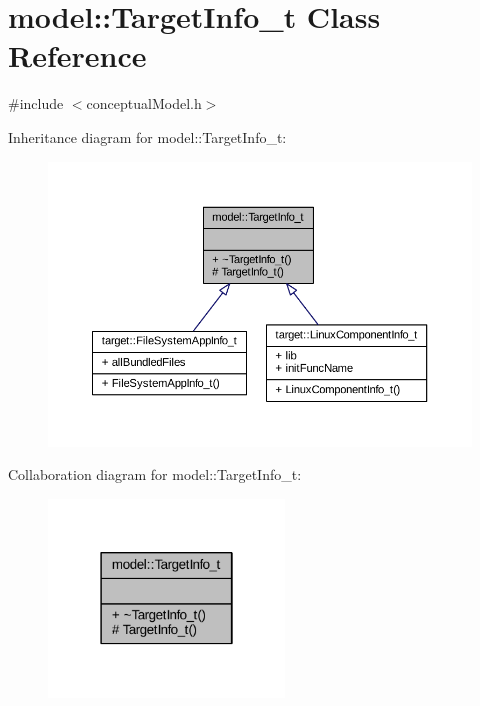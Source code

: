 \hypertarget{classmodel_1_1_target_info__t}{}\section{model\+:\+:Target\+Info\+\_\+t Class Reference}
\label{classmodel_1_1_target_info__t}


{\ttfamily \#include $<$conceptual\+Model.\+h$>$}



Inheritance diagram for model\+:\+:Target\+Info\+\_\+t\+:
\nopagebreak
\begin{figure}[H]
\begin{center}
\leavevmode
\includegraphics[width=350pt]{classmodel_1_1_target_info__t__inherit__graph}
\end{center}
\end{figure}


Collaboration diagram for model\+:\+:Target\+Info\+\_\+t\+:
\nopagebreak
\begin{figure}[H]
\begin{center}
\leavevmode
\includegraphics[width=178pt]{classmodel_1_1_target_info__t__coll__graph}
\end{center}
\end{figure}
